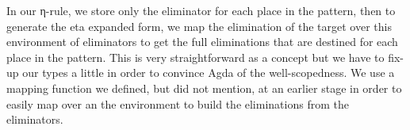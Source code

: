 In our η-rule, we store only the eliminator for each place in the pattern,
then to generate the eta expanded form, we map the elimination of the target
over this environment of eliminators to get the full eliminations that
are destined for each place in the pattern. This is very straightforward
as a concept but we have to fix-up our types a little in order to convince
Agda of the well-scopedness. We use a mapping function we defined, but did not
mention, at an earlier stage in order to easily map over an the environment to
build the eliminations from the eliminators.
\begin{code}%
\>[0]\AgdaSpace{}%
\AgdaSpace{}%
\AgdaSymbol{:}\AgdaSpace{}%
\AgdaSpace{}%
\<%
\\
\>[0][@{}l@{\AgdaIndent{0}}]%
\>[2]\AgdaSpace{}%
\<%
\\
%
\\[\AgdaEmptyExtraSkip]%
%
\>[2]\<%
\\
\>[2][@{}l@{\AgdaIndent{0}}]%
\>[4]%
\>[17]\AgdaSymbol{:}%
\>[20]\<%
\\
%
\>[4]%
\>[17]\AgdaSymbol{:}%
\>[20]\AgdaSpace{}%
\AgdaSpace{}%
\<%
\\
%
\>[2]\AgdaSpace{}%
\AgdaSymbol{=}\AgdaSpace{}%
\AgdaSpace{}%
\<%
\\
%
\\[\AgdaEmptyExtraSkip]%
%
\>[2]\AgdaSpace{}%
\AgdaSymbol{:}\AgdaSpace{}%
\AgdaSymbol{(}\AgdaSpace{}%
\AgdaSpace{}%
\AgdaSymbol{:}\AgdaSpace{}%
\AgdaSpace{}%
\AgdaSymbol{)}\AgdaSpace{}%
\AgdaSpace{}%
\AgdaSymbol{(}\AgdaSpace{}%
\AgdaSpace{}%
\AgdaSymbol{)}\AgdaSpace{}%
\<%
\\
%
\>[2]\AgdaSpace{}%
\AgdaSymbol{\{}\AgdaSymbol{\}}\AgdaSpace{}%
\AgdaSpace{}%
\<%
\\
\>[2][@{}l@{\AgdaIndent{0}}]%
\>[4]\AgdaSymbol{=}%
\>[87I]\<%
\\
\>[87I][@{}l@{\AgdaIndent{0}}]%
\>[8]\AgdaSpace{}%

\end{code}
